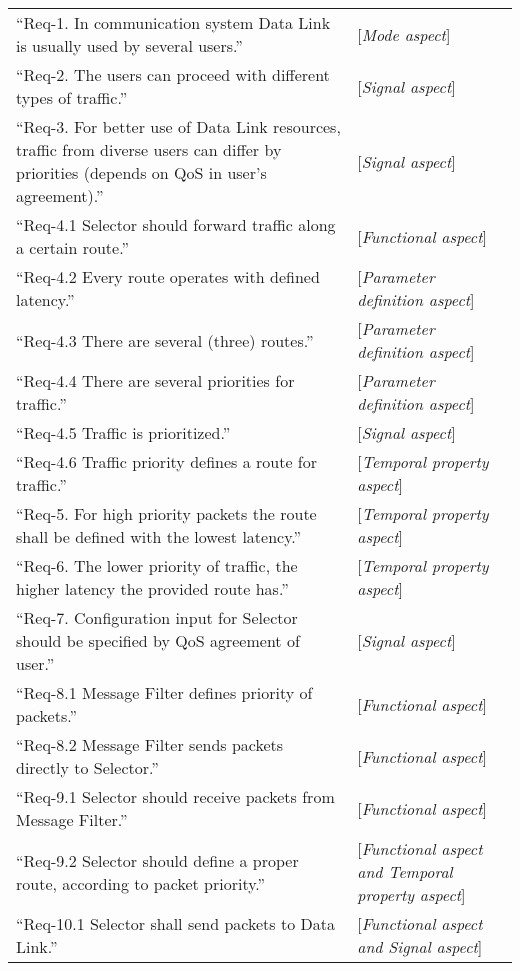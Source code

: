 \begin{table*}
	\centering
		\begin{tabular}{| p{11cm}  | p{6cm} |}
			\small ``Req-1.	 In communication system Data Link is usually used by several users.'' &	[\textit{Mode aspect}]\\
``Req-2.	The users can proceed with different types of traffic.'' & [\textit{Signal aspect}]\\	
``Req-3.	For better use of Data Link resources, traffic from diverse users can differ by priorities (depends on QoS in user's agreement).'' & [\textit{Signal aspect}] \\
``Req-4.1	 Selector should forward traffic along a certain route.''& [\textit{Functional aspect}]\\ 
``Req-4.2	Every route operates with defined latency.'' & [\textit{Parameter definition aspect}]\\		
``Req-4.3	There are several (three) routes.'' & [\textit{Parameter definition aspect}] \\
``Req-4.4 There are several priorities for traffic.'' & [\textit{Parameter definition aspect}]\\
``Req-4.5	Traffic is prioritized.'' & [\textit{Signal aspect}] \\
``Req-4.6	Traffic priority defines a route for traffic.'' & [\textit{Temporal property aspect}] 	\\
``Req-5.	For high priority packets the route shall be defined with the lowest latency.'' & [\textit{Temporal property aspect}] \\
``Req-6.	The lower priority of traffic, the higher latency the provided route has.'' & [\textit{Temporal property aspect}] \\
``Req-7.	Configuration input for Selector should be specified by QoS agreement of user.'' & [\textit{Signal aspect}] \\
``Req-8.1	Message Filter defines priority of packets.'' & [\textit{Functional aspect}] \\	
``Req-8.2 Message Filter sends packets directly to Selector.'' &  [\textit{Functional aspect}] \\
``Req-9.1	Selector should receive packets from Message Filter.'' & [\textit{Functional aspect}] \\
``Req-9.2	Selector should define a proper route, according to packet priority.'' & [\textit{Functional aspect and Temporal property aspect}]\\
``Req-10.1	Selector shall send packets to Data Link.'' & [\textit{Functional aspect and Signal aspect}] \\

\end{tabular}
\end{table*}
